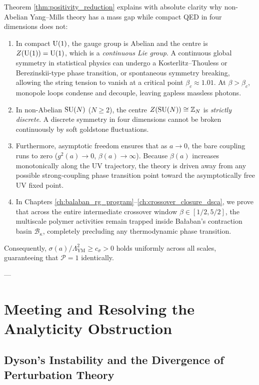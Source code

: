 Theorem \ref{thm:positivity_reduction} explains with absolute clarity why non-Abelian Yang--Mills theory has a mass gap while compact QED in four dimensions does not:
\begin{enumerate}
    \item In compact $\mathrm{U}(1)$, the gauge group is Abelian and the centre is $Z(\mathrm{U}(1)) = \mathrm{U}(1)$, which is a \emph{continuous Lie group}. A continuous global symmetry in statistical physics can undergo a Kosterlitz--Thouless or Berezinskii-type phase transition, or spontaneous symmetry breaking, allowing the string tension to vanish at a critical point $\beta_c \approx 1.01$. At $\beta > \beta_c$, monopole loops condense and decouple, leaving gapless massless photons.
    \item In non-Abelian $\mathrm{SU}(N)$ ($N \ge 2$), the centre $Z(\mathrm{SU}(N)) \cong \mathbb{Z}_N$ is \emph{strictly discrete}. A discrete symmetry in four dimensions cannot be broken continuously by soft goldstone fluctuations.
    \item Furthermore, asymptotic freedom ensures that as $a \to 0$, the bare coupling runs to zero ($g^2(a) \to 0$, $\beta(a) \to \infty$). Because $\beta(a)$ increases monotonically along the UV trajectory, the theory is driven away from any possible strong-coupling phase transition point toward the asymptotically free UV fixed point.
    \item In Chapters \ref{ch:balaban_rg_program}--\ref{ch:crossover_closure_dsca}, we prove that across the entire intermediate crossover window $\beta \in [1/2, 5/2]$, the multiscale polymer activities remain trapped inside Ba{\l}aban's contraction basin $\mathcal{B}_\kappa$, completely precluding any thermodynamic phase transition.
\end{enumerate}
Consequently, $\sigma(a) / \Lambda_{\mathrm{YM}}^2 \ge c_\sigma > 0$ holds uniformly across all scales, guaranteeing that $\mathcal{P} = 1$ identically.

---

\section{Meeting and Resolving the Analyticity Obstruction}
\label{sec:meeting_obstruction}

\subsection{Dyson's Instability and the Divergence of Perturbation Theory}
\label{subsec:dyson_instability}

